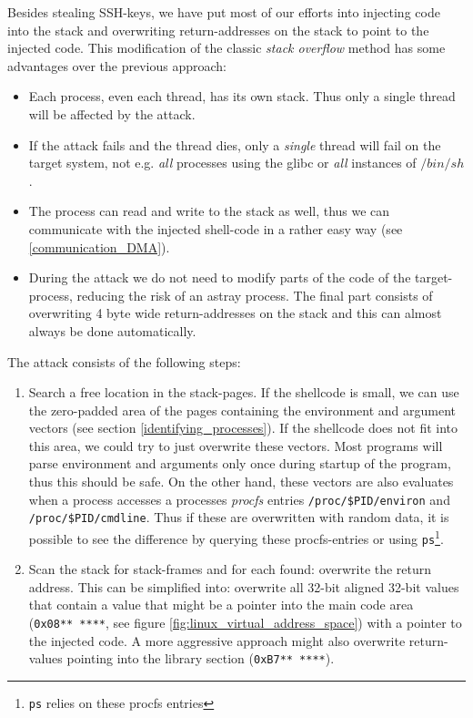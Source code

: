 \label{overwriting_stack} Besides stealing SSH-keys, we have put most of our
efforts into injecting code into the stack and overwriting return-addresses on
the stack to point to the injected code. This modification of the classic
\emph{stack overflow} method has some advantages over the previous approach:

\begin{itemize}

	\item Each process, even each thread, has its own stack. Thus only a
		single thread will be affected by the attack.

	\item If the attack fails and the thread dies, only a \emph{single}
	thread will fail on the target system, not e.g\@. \emph{all} processes
	using the glibc or \emph{all} instances of $/bin/sh$.

	\item The process can read and write to the stack as well, thus we can
		communicate with the injected shell-code in a rather easy way
		(see \ref{communication_DMA}).

	\item During the attack we do not need to modify parts of the code of
		the target-process, reducing the risk of an astray process. The
		final part consists of overwriting 4 byte wide return-addresses
		on the stack and this can almost always be done automatically.

\end{itemize}

The attack consists of the following steps:

\begin{enumerate}

	\item Search a free location in the stack-pages. If the shellcode is
		small, we can use the zero-padded area of the pages containing
		the environment and argument vectors (see section
		\ref{identifying_processes}). If the shellcode does not fit into
		this area, we could try to just overwrite these vectors. Most
		programs will parse environment and arguments only once during
		startup of the program, thus this should be safe. On the other
		hand, these vectors are also evaluates when a process accesses a
		processes \emph{procfs} entries \texttt{/proc/\$PID/environ} and
		\texttt{/proc/\$PID/cmdline}. Thus if these are overwritten with
		random data, it is possible to see the difference by querying
		these procfs-entries or using \texttt{ps}\footnote{\texttt{ps}
		relies on these procfs entries}.


	\item Scan the stack for stack-frames and for each found: overwrite the
		return address. This can be simplified into: overwrite all
		32-bit aligned 32-bit values that contain a value that might be
		a pointer into the main code area (\texttt{0x08**~****}, see
		figure \ref{fig:linux_virtual_address_space}) with a pointer to
		the injected code. A more aggressive approach might also
		overwrite return-values pointing into the library section
		(\texttt{0xB7**~****}).

\end{enumerate}

